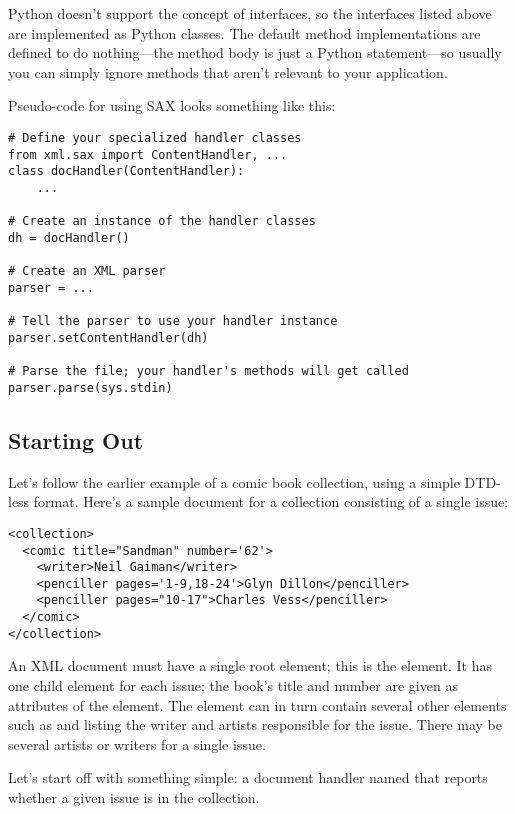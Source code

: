 \documentclass{howto}
\newcommand{\element}[1]{\code{#1}}
\begin{document}
Python doesn't support the concept of interfaces, so the interfaces
listed above are implemented as Python classes.  The default method
implementations are defined to do nothing---the method body is just a
Python  statement---so usually you can simply ignore methods
that aren't relevant to your application. 

Pseudo-code for using SAX looks something like this:
\begin{verbatim}
# Define your specialized handler classes
from xml.sax import ContentHandler, ...
class docHandler(ContentHandler):
    ...

# Create an instance of the handler classes
dh = docHandler()

# Create an XML parser
parser = ...

# Tell the parser to use your handler instance
parser.setContentHandler(dh)

# Parse the file; your handler's methods will get called
parser.parse(sys.stdin)
\end{verbatim}

\subsection{Starting Out}

Let's follow the earlier example of a comic book collection, using a
simple DTD-less format. Here's a sample document for a collection
consisting of a single issue:

\begin{verbatim}
<collection>
  <comic title="Sandman" number='62'>
    <writer>Neil Gaiman</writer>
    <penciller pages='1-9,18-24'>Glyn Dillon</penciller>
    <penciller pages="10-17">Charles Vess</penciller>
  </comic>
</collection>
\end{verbatim}

An XML document must have a single root element; this is the
 element.  It has one child \element{comic} element
for each issue; the book's title and number are given as attributes of
the \element{comic} element.  The \element{comic} element can in turn
contain several other elements such as \element{writer} and
\element{penciller} listing the writer and artists responsible for the
issue.  There may be several artists or writers for a single issue.

Let's start off with something simple: a document handler named
 that reports whether a given issue is in the
collection.
\end{document}
